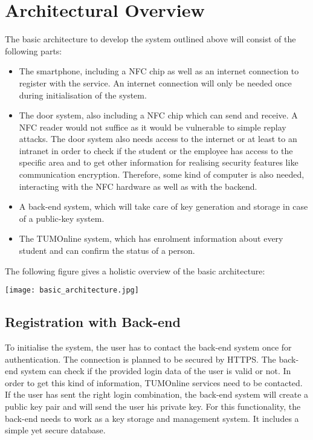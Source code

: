 \section{Architectural Overview}\label{sec:arch}

The basic architecture to develop the system outlined above will consist of the following parts:

\begin{itemize}
\item The smartphone, including a NFC chip as well as an internet connection to register with the service. An internet connection will only be needed once during initialisation of the system.
\item The door system, also including a NFC chip which can send and receive. A NFC reader would not suffice as it would be vulnerable to simple replay attacks. The door system also needs access to the internet or at least to an intranet in order to check if the student or the employee has access to the specific area and to get other information for realising security features like communication encryption. Therefore, some kind of computer is also needed, interacting with the NFC hardware as well as with the backend.
\item A back-end system, which will take care of key generation and storage in case of a public-key system.

\item The TUMOnline system, which has enrolment information about every student and can confirm the status of a person.
\end{itemize} 
 
 
 The following figure gives a holistic overview of the basic architecture: \newline
 \begin{center}
	\texttt{[image: basic\_architecture.jpg]}
\end{center}


\subsection{Registration with Back-end}
To initialise the system, the user has to contact the back-end system once for authentication.
The connection is planned to be secured by HTTPS.
The back-end system can check if the provided login data of the user is valid or not. 
In order to get this kind of information, TUMOnline services need to be contacted.
If the user has sent the right login combination, the back-end system will create a public key pair and will send the user his private key.
For this functionality, the back-end needs to work as a key storage and management system. It includes a simple yet secure database.


